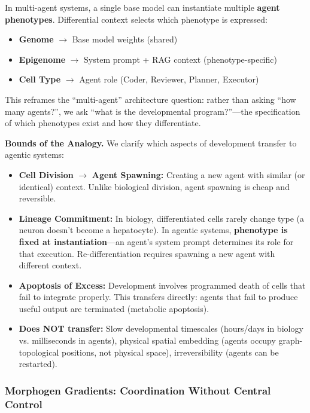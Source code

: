In multi-agent systems, a single base model can instantiate multiple \textbf{agent phenotypes}. Differential
context selects which phenotype is expressed:
\begin{itemize}[leftmargin=*]
\item \textbf{Genome} $\to$ Base model weights (shared)
\item \textbf{Epigenome} $\to$ System prompt + RAG context (phenotype-specific)
\item \textbf{Cell Type} $\to$ Agent role (Coder, Reviewer, Planner, Executor)
\end{itemize}

This reframes the ``multi-agent'' architecture question: rather than asking ``how many agents?'', we ask
``what is the developmental program?''---the specification of which phenotypes exist and how they differentiate.

\textbf{Bounds of the Analogy.} We clarify which aspects of development transfer to agentic systems:
\begin{itemize}[leftmargin=*]
\item \textbf{Cell Division} $\to$ \textbf{Agent Spawning:} Creating a new agent with similar (or identical)
context. Unlike biological division, agent spawning is cheap and reversible.
\item \textbf{Lineage Commitment:} In biology, differentiated cells rarely change type (a neuron doesn't become
a hepatocyte). In agentic systems, \textbf{phenotype is fixed at instantiation}---an agent's system prompt
determines its role for that execution. Re-differentiation requires spawning a new agent with different context.
\item \textbf{Apoptosis of Excess:} Development involves programmed death of cells that fail to integrate properly.
This transfers directly: agents that fail to produce useful output are terminated (metabolic apoptosis).
\item \textbf{Does NOT transfer:} Slow developmental timescales (hours/days in biology vs. milliseconds in agents),
physical spatial embedding (agents occupy graph-topological positions, not physical space), irreversibility (agents can be restarted).
\end{itemize}

\subsubsection{Morphogen Gradients: Coordination Without Central Control}

